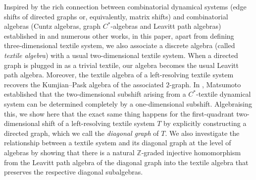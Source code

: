 \documentclass[a4paper,reqno,12pt]{amsart}
\theoremstyle{definition}
\theoremstyle{remark}
\begin{document}
Inspired by the rich connection between combinatorial dynamical systems (edge shifts of directed graphs or, equivalently, matrix shifts) and combinatorial algebras (Cuntz algebras, graph $C^*$-algebras and Leavitt path algebras) established in \cite{ALPS, Bates-Pask,Carlsen,CK,Hazdyn} and numerous other works, in this paper, apart from defining three-dimensional textile system, we also associate a discrete algebra (called \emph{textile algebra}) with a usual two-dimensional textile system. When a directed graph is plugged in as a trivial textile, our algebra becomes the usual Leavitt path algebra. Moreover, the textile algebra of a left-resolving textile system recovers the Kumjian--Pask algebra of the associated $2$-graph. In \cite[Lemma 3.2]{Matsumoto}, Matsumoto established that the two-dimensional subshift arising from a $C^*$-textile dynamical system can be determined completely by a one-dimensional subshift. Algebraising this, we show here that the exact same thing happens for the first-quadrant two-dimensional shift of a left-resolving textile system $T$ by explicitly constructing a directed graph, which we call the \emph{diagonal graph} of $T$. We also investigate the relationship between a textile system and its diagonal graph at the level of algebras by showing that there is a natural $\mathbb{Z}$-graded injective homomorphism from the Leavitt path algebra of the diagonal graph into the textile algebra that preserves the respective diagonal subalgebras. 
\end{document}
